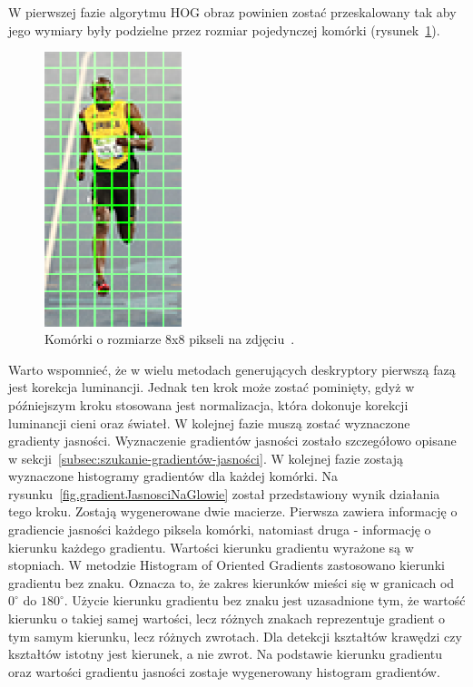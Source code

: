 \documentclass[a4paper,twoside,12pt]{book}
\begin{document}
    W pierwszej fazie algorytmu HOG obraz powinien zostać przeskalowany tak aby jego wymiary były podzielne przez
    rozmiar
    pojedynczej komórki
    (rysunek~\ref{fig.komorkiHoga}).
    \begin{figure}
        \centering
        \includegraphics[width=4cm]{Obrazy/komorkiHoga.jpg}
        \caption{Komórki o rozmiarze 8x8 pikseli na zdjęciu~\cite{hogOpenCv}.}
        \label{fig.komorkiHoga}
    \end{figure}
    Warto wspomnieć, że w wielu metodach generujących deskryptory pierwszą fazą jest korekcja luminancji.
    Jednak ten krok może zostać pominięty, gdyż w późniejszym kroku stosowana jest normalizacja,
    która dokonuje korekcji luminancji cieni oraz świateł.
    W kolejnej fazie muszą zostać wyznaczone gradienty jasności.
    Wyznaczenie gradientów jasności zostało szczegółowo opisane w sekcji~\ref{subsec:szukanie-gradientów-jasności}.
    W kolejnej fazie zostają wyznaczone histogramy gradientów dla każdej komórki.
    Na rysunku~\ref{fig.gradientJasnosciNaGlowie} został przedstawiony wynik działania tego kroku.
    Zostają wygenerowane dwie macierze. Pierwsza zawiera informację o gradiencie jasności każdego piksela komórki,
    natomiast druga - informację o kierunku każdego gradientu.
    Wartości kierunku gradientu wyrażone są w stopniach. W metodzie Histogram of Oriented Gradients
    zastosowano kierunki gradientu bez znaku. Oznacza to, że zakres kierunków mieści się w granicach
    od $0^{\circ}$ do $180^{\circ}$.
    Użycie kierunku gradientu bez znaku jest uzasadnione tym,
    że wartość kierunku o takiej samej wartości, lecz różnych znakach reprezentuje gradient o tym samym kierunku, lecz
    różnych zwrotach. Dla detekcji kształtów krawędzi czy kształtów istotny jest kierunek, a nie zwrot.
    Na podstawie kierunku gradientu oraz wartości gradientu jasności zostaje wygenerowany histogram gradientów.
\end{document}
